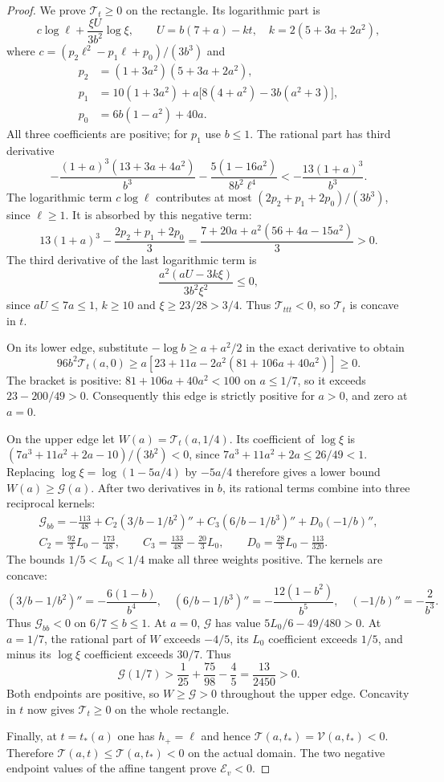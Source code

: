 \begin{proof}
We prove $\mathcal T_t\ge0$ on the rectangle. Its logarithmic part is
\[
 c\log\ell+\frac{\xi U}{3b^2}\log\xi,\qquad
 U=b(7+a)-kt,\quad k=2(5+3a+2a^2),
\]
where $c=(p_2\ell^2-p_1\ell+p_0)/(3b^3)$ and
\begin{align*}
 p_2&=(1+3a^2)(5+3a+2a^2),\\
 p_1&=10(1+3a^2)+a\bigl[8(4+a^2)-3b(a^2+3)\bigr],\\
 p_0&=6b(1-a^2)+40a.
\end{align*}
All three coefficients are positive; for $p_1$ use $b\le1$.
The rational part has third derivative
\[
 -\frac{(1+a)^3(13+3a+4a^2)}{b^3}
 -\frac{5(1-16a^2)}{8b^2\ell^4}
 <-\frac{13(1+a)^3}{b^3}.
\]
The logarithmic term $c\log\ell$ contributes at most
$(2p_2+p_1+2p_0)/(3b^3)$, since $\ell\ge1$. It is absorbed by this negative term:
\[
 13(1+a)^3-\frac{2p_2+p_1+2p_0}{3}
 =\frac{7+20a+a^2(56+4a-15a^2)}3>0.
\]
The third derivative of the last logarithmic term is
\[
 \frac{a^2(aU-3k\xi)}{3b^2\xi^2}\le0,
\]
since $aU\le7a\le1$, $k\ge10$ and $\xi\ge23/28>3/4$.
Thus $\mathcal T_{ttt}<0$, so $\mathcal T_t$ is concave in $t$.

On its lower edge, substitute $-\log b\ge a+a^2/2$ in the exact derivative to obtain
\[
 96b^2\mathcal T_t(a,0)
 \ge a\left[23+11a-2a^2(81+106a+40a^2)\right]\ge0.
\]
The bracket is positive: $81+106a+40a^2<100$ on $a\le1/7$, so it exceeds
$23-200/49>0$. Consequently this edge is strictly positive for $a>0$, and zero at $a=0$.

On the upper edge let $W(a)=\mathcal T_t(a,1/4)$.
Its coefficient of $\log\xi$ is
$(7a^3+11a^2+2a-10)/(3b^2)<0$, since $7a^3+11a^2+2a\le26/49<1$.
Replacing $\log\xi=\log(1-5a/4)$ by $-5a/4$ therefore gives a lower bound
$W(a)\ge\mathcal G(a)$.
After two derivatives in $b$, its rational terms combine into three reciprocal kernels:
\begin{gather*}
 \mathcal G_{bb}=-\frac{113}{48}
       +C_2(3/b-1/b^2)''+C_3(6/b-1/b^3)''+D_0(-1/b)'',\\
 C_2=\frac{92}{3}L_0-\frac{173}{48},\qquad
 C_3=\frac{133}{48}-\frac{20}{3}L_0,\qquad
 D_0=\frac{28}{3}L_0-\frac{113}{320}.
\end{gather*}
The bounds $1/5<L_0<1/4$ make all three weights positive. The kernels are concave:
\[
 (3/b-1/b^2)''=-\frac{6(1-b)}{b^4},\quad
 (6/b-1/b^3)''=-\frac{12(1-b^2)}{b^5},\quad
 (-1/b)''=-\frac2{b^3}.
\]
Thus $\mathcal G_{bb}<0$ on $6/7\le b\le1$.
At $a=0$, $\mathcal G$ has value $5L_0/6-49/480>0$.
At $a=1/7$, the rational part of $W$ exceeds $-4/5$, its $L_0$ coefficient exceeds $1/5$,
and minus its $\log\xi$ coefficient exceeds $30/7$. Thus
\[
 \mathcal G(1/7)>\frac1{25}+\frac{75}{98}-\frac45=\frac{13}{2450}>0.
\]
Both endpoints are positive, so $W\ge\mathcal G>0$ throughout the upper edge.
Concavity in $t$ now gives $\mathcal T_t\ge0$ on the whole rectangle.

Finally, at $t=t_*(a)$ one has $h_+=\ell$ and hence
$\mathcal T(a,t_*)=\mathcal V(a,t_*)<0$.
Therefore $\mathcal T(a,t)\le\mathcal T(a,t_*)<0$ on the actual domain.
The two negative endpoint values of the affine tangent prove $\mathcal E_v<0$.
\end{proof}

